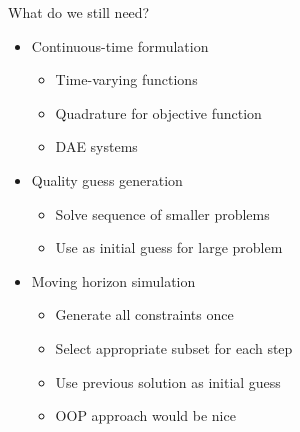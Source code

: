 \documentclass[xcolor=dvipsnames]{beamer}
\begin{document}
\begin{frame}{What do we still need?}
    \begin{itemize}
        \item Continuous-time formulation
        \begin{itemize}
            \item Time-varying functions
            \item Quadrature for objective function
            \item DAE systems
        \end{itemize}
        \item Quality guess generation
        \begin{itemize}
            \item Solve sequence of smaller problems
            \item Use as initial guess for large problem
        \end{itemize}
        \item Moving horizon simulation
        \begin{itemize}
            \item Generate all constraints once
            \item Select appropriate subset for each step
            \item Use previous solution as initial guess
            \item OOP approach would be nice
        \end{itemize}
    \end{itemize}
\end{frame}
\end{document}
